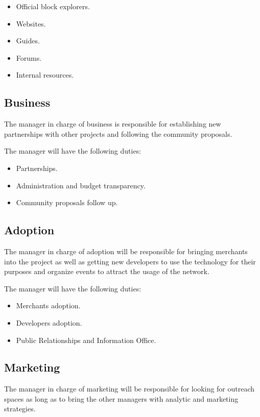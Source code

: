 \documentclass{article}
\begin{document}
\begin{itemize}
  \item Official block explorers.
  \item Websites.
  \item Guides.
  \item Forums.
  \item Internal resources.
\end{itemize}


\subsection{Business}

The manager in charge of business is responsible for establishing new partnerships with other projects and following the community proposals.

The manager will have the following duties:

\begin{itemize}
  \item Partnerships.
  \item Administration and budget transparency.
  \item Community proposals follow up.
\end{itemize}

\subsection{Adoption}

The manager in charge of adoption will be responsible for bringing merchants into the project as well as getting new developers to use the technology for their purposes and organize events to attract the usage of the network.

The manager will have the following duties:

\begin{itemize}
  \item Merchants adoption.
  \item Developers adoption.
  \item Public Relationships and Information Office.
\end{itemize}

\subsection{Marketing}

The manager in charge of marketing will be responsible for looking for outreach spaces as long as to bring the other managers with analytic and marketing strategies.
\end{document}
